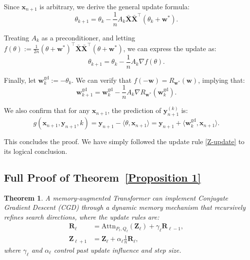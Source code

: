 \documentclass[11pt]{article}
\newtheorem*{theorem*}{Theorem}
\theoremstyle{plain}
\theoremstyle{definition}
\theoremstyle{remark}
\numberwithin{equation}{section}
\begin{document}
Since \( \mathbf{x}_{n+1} \) is arbitrary, we derive the general update formula:
\begin{equation}
\theta_{k+1} = \theta_k - \frac{1}{n} A_k \mathbf{\bar{X}} \mathbf{\bar{X}}^\top (\theta_k + \mathbf{w}^*).
\label{thetak_update}
\end{equation}

Treating \( A_k \) as a preconditioner, and letting \( f(\theta) := \frac{1}{2n} (\theta + \mathbf{w}^*)^\top \mathbf{\bar{X}} \mathbf{\bar{X}}^\top (\theta + \mathbf{w}^*) \), we can express the update as:
\begin{equation}
\theta_{k+1} = \theta_k - \frac{1}{n} A_k \nabla f(\theta).
\label{theta_k_preconditionedGD}
\end{equation}

Finally, let \( \mathbf{w}_k^{\text{gd}} := -\theta_k \). We can verify that \( f(-\mathbf{w}) = R_{\mathbf{w}^*}(\mathbf{w}) \), implying that:
\begin{equation}
\mathbf{w}_{k+1}^{\text{gd}} = \mathbf{w}_k^{\text{gd}} - \frac{1}{n} A_k \nabla R_{\mathbf{w}^*}(\mathbf{w}_k^{\text{gd}}).
\label{wk_update}
\end{equation}

We also confirm that for any \( \mathbf{x}_{n+1} \), the prediction of \( \mathbf{y}_{n+1}^{(k)} \) is:
\[
g(\mathbf{x}_{n+1}, \mathbf{y}_{n+1}, k) = \mathbf{y}_{n+1} - \langle \theta, \mathbf{x}_{n+1} \rangle = \mathbf{y}_{n+1} + \langle \mathbf{w}_k^{\text{gd}}, \mathbf{x}_{n+1} \rangle.
\]

This concludes the proof. We have simply followed the update rule \eqref{Z-update} to its logical conclusion.

\subsection{Full Proof of Theorem~\ref{Proposition 1}}

\begin{theorem*}
A memory-augmented Transformer can implement Conjugate Gradient Descent (CGD) through a dynamic memory mechanism that recursively refines search directions, where the update rules are:
\begin{align}
    \mathbf{R}_\ell &= \mathrm{Attn}_{P_\ell, Q_\ell}(\mathbf{Z}_\ell) + \gamma_\ell \mathbf{R}_{\ell-1}, \label{eq:dynamic-mem_update_proof} \\
    \mathbf{Z}_{\ell+1} &= \mathbf{Z}_\ell + \alpha_\ell \frac{1}{n} \mathbf{R}_\ell, \label{eq:dynamic-mem_proof}
\end{align}
where \( \gamma_\ell \) and \( \alpha_\ell \) control past update influence and step size.
\end{theorem*}
\end{document}
